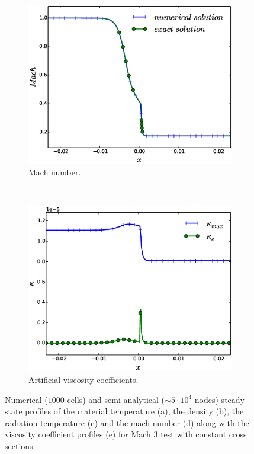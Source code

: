 \documentclass[times,doublespace]{fldauth}%
\begin{document}
\begin{figure}[h]
    \begin{center}
    \begin{subfigure}{0.32\textwidth}
    \centering
    \includegraphics[width=\linewidth]{figures/cst-xs/mach-3/mass-diff-mach-number-nel-1000-plot.eps}
    \caption{Mach number.}\label{fig:mach-3-cst-xs-mach}
    \end{subfigure}
    ~
    \begin{subfigure}{0.32\textwidth}
    \centering
    \includegraphics[width=\linewidth]{figures/cst-xs/mach-3/mass-diff-visc-nel-1000-plot.eps}
    \caption{Artificial viscosity coefficients.}\label{fig:mach-3-cst-xs-visc}
    \end{subfigure}        
    \end{center}
\caption{Numerical ($1000$ cells) and semi-analytical ($\sim 5 \cdot 10^4$ nodes) steady-state profiles of the material temperature (a), the density (b), the radiation temperature (c) and the mach number (d) along with the viscosity coefficient profiles (e) for Mach $3$ test with constant cross sections.}\label{fig:mach-3-cst-xs}      
\end{figure}
%
\pagebreak
\end{document}
